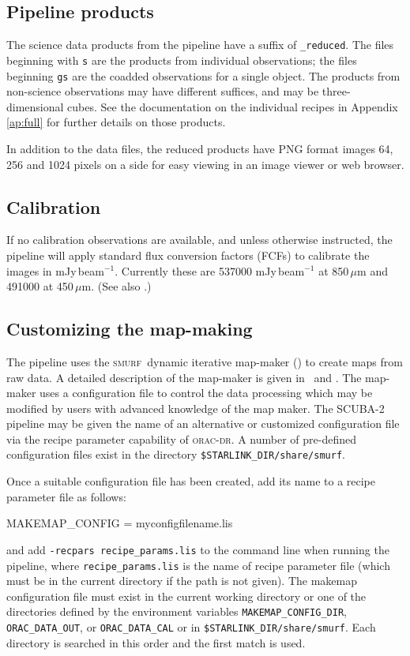 \documentclass[twoside,11pt,nolof]{starlink}
\providecommand{\SMURF}{\textsc{smurf}}
\providecommand{\SMURFcook}{\xref{SC/21}{sc21}{}}
\providecommand{\oracdr}{\textsc{orac-dr}}
\providecommand{\task}[1]{\textsf{#1}}
\providecommand{\makemap}{\xref{\task{makemap}}{sun258}{MAKEMAP}}
\begin{document}
\subsection{Pipeline products}

The science data products from the pipeline have a suffix of
\verb+_reduced+. The files beginning with \verb+s+ are the products
from individual observations; the files beginning \verb+gs+ are the
coadded observations for a single object. The products from
non-science observations may have different suffices, and may be
three-dimensional cubes. See the documentation on the individual
recipes in Appendix\,\ref{ap:full} for further details on those
products.

In addition to the data files, the reduced products have PNG format
images 64, 256 and 1024 pixels on a side for easy viewing in an image
viewer or web browser.

\subsection{Calibration\label{sse:cal}}

If no calibration observations are available, and unless otherwise
instructed, the pipeline will apply standard flux conversion factors
(FCFs) to calibrate the images in mJy\,beam$^{-1}$. Currently these
are 537000 mJy\,beam$^{-1}$ at 850\,$\mu$m and 491000 at
450\,$\mu$m. (See also \cite{scuba2calpaper}.)

\subsection{Customizing the map-making}

The pipeline uses the \SMURF\ dynamic iterative map-maker (\makemap)
to create maps from raw data. A detailed description of the map-maker
is given in \SMURFcook\ and \cite{smurfpaper}. The map-maker uses a
configuration file to control the data processing which may be
modified by users with advanced knowledge of the map maker. The
SCUBA-2 pipeline may be given the name of an alternative or customized
configuration file via the recipe parameter capability of \oracdr. A
number of pre-defined configuration files exist in the directory
\verb+$STARLINK_DIR/share/smurf+.

Once a suitable configuration file has been created, add its name to a
recipe parameter file as follows:
\begin{terminalv}
MAKEMAP_CONFIG = myconfigfilename.lis
\end{terminalv}
and add \texttt{-recpars recipe\_params.lis} to the command line when
running the pipeline, where \verb+recipe_params.lis+ is the name of
recipe parameter file (which must be in the current directory if the
path is not given). The \task{makemap} configuration file must exist
in the current working directory or one of the directories defined by
the environment variables \verb+MAKEMAP_CONFIG_DIR+,
\verb+ORAC_DATA_OUT+, or \verb+ORAC_DATA_CAL+ or in
\verb+$STARLINK_DIR/share/smurf+. Each directory is searched in this
order and the first match is used.
\end{document}
